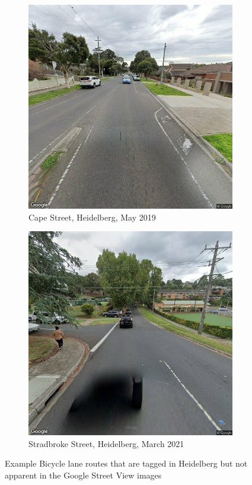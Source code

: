 \documentclass[11pt,twoside]{report}
\begin{document}
\begin{figure}[h]
\centering
\begin{subfigure}{0.45\textwidth}
	\includegraphics[width=\textwidth]{Heidelberg/Cape_St_South.jpg}
	\caption{Cape Street, Heidelberg, May 2019}
	\label{fig:osm_err1}
\end{subfigure}
\hfill
\begin{subfigure}{0.45\textwidth}
	\includegraphics[width=\textwidth]{Heidelberg/Stradbroke_St_South_202103.jpg}
	\caption{Stradbroke Street, Heidelberg, March 2021}
	\label{fig:osm_err2}
\end{subfigure}
\caption{Example Bicycle lane routes that are tagged in Heidelberg but not apparent in the Google Street View images}
\label{fig:heidelberg_osm_errors}
\end{figure}
\end{document}
